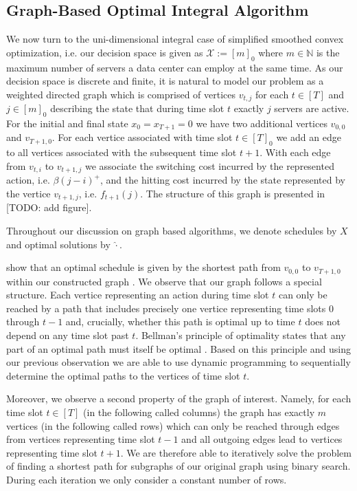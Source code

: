 \subsection{Graph-Based Optimal Integral Algorithm}

We now turn to the uni-dimensional integral case of simplified smoothed convex optimization, i.e. our decision space is given as $\mathcal{X} := [m]_0$ where $m \in \mathbb{N}$ is the maximum number of servers a data center can employ at the same time. As our decision space is discrete and finite, it is natural to model our problem as a weighted directed graph which is comprised of vertices $v_{t,j}$ for each $t \in [T]$ and $j \in [m]_0$ describing the state that during time slot $t$ exactly $j$ servers are active. For the initial and final state $x_0 = x_{T+1} = 0$ we have two additional vertices $v_{0,0}$ and $v_{T+1,0}$. For each vertice associated with time slot $t \in [T]_0$ we add an edge to all vertices associated with the subsequent time slot $t + 1$. With each edge from $v_{t,i}$ to $v_{t+1,j}$ we associate the switching cost incurred by the represented action, i.e. $\beta (j - i)^+$, and the hitting cost incurred by the state represented by the vertice $v_{t+1,j}$, i.e. $f_{t+1}(j)$. The structure of this graph is presented in [TODO: add figure].

Throughout our discussion on graph based algorithms, we denote schedules by $X$ and optimal solutions by $\hat{\cdot}$.

\citeauthor*{Albers2018} show that an optimal schedule is given by the shortest path from $v_{0,0}$ to $v_{T+1,0}$ within our constructed graph \cite{Albers2018}. We observe that our graph follows a special structure. Each vertice representing an action during time slot $t$ can only be reached by a path that includes precisely one vertice representing time slots $0$ through $t - 1$ and, crucially, whether this path is optimal up to time $t$ does not depend on any time slot past $t$. Bellman's principle of optimality states that any part of an optimal path must itself be optimal \cite{Bellman1954}. Based on this principle and using our previous observation we are able to use dynamic programming to sequentially determine the optimal paths to the vertices of time slot $t$.

Moreover, we observe a second property of the graph of interest. Namely, for each time slot $t \in [T]$ (in the following called columns) the graph has exactly $m$ vertices (in the following called rows) which can only be reached through edges from vertices representing time slot $t - 1$ and all outgoing edges lead to vertices representing time slot $t + 1$. We are therefore able to iteratively solve the problem of finding a shortest path for subgraphs of our original graph using binary search. During each iteration we only consider a constant number of rows.

